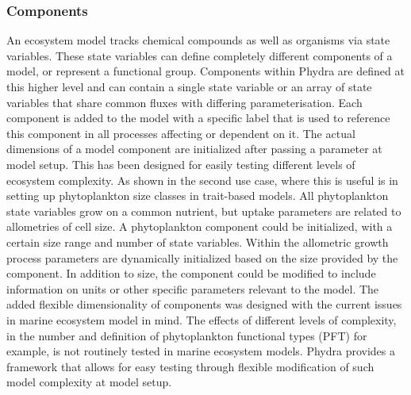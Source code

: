 \documentclass[template.tex]{subfiles}
\begin{document}
\subsubsection{Components}

An ecosystem model tracks chemical compounds as well as organisms via state variables. These state variables can define completely different components of a model, or represent a functional group. Components within Phydra are defined at this higher level and can contain a single state variable or an array of state variables that share common fluxes with differing parameterisation. Each component is added to the model with a specific label that is used to reference this component in all processes affecting or dependent on it. The actual dimensions of a model component are initialized after passing a parameter at model setup. This has been designed for easily testing different levels of ecosystem complexity. As shown in the second use case, where this is useful is in setting up phytoplankton size classes in trait-based models. All phytoplankton state variables grow on a common nutrient, but uptake parameters are related to allometries of cell size. A phytoplankton component could be initialized, with a certain size range and number of state variables. Within the allometric growth process parameters are dynamically initialized based on the size provided by the component. 
In addition to size, the component could be modified to include information on units or other specific parameters relevant to the model. The added flexible dimensionality of components was designed with the current issues in marine ecosystem model in mind. The effects of different levels of complexity, in the number and definition of phytoplankton functional types (PFT) for example, is not routinely tested in marine ecosystem models. Phydra provides a framework that allows for easy testing through flexible modification of such model complexity at model setup.
\end{document}
